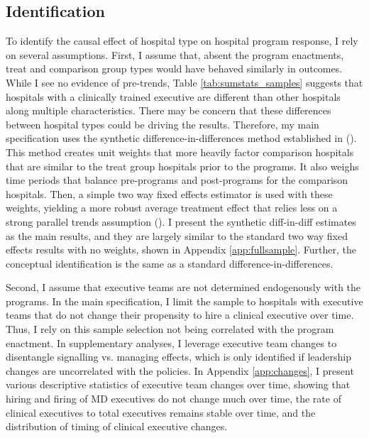 \documentclass[12pt]{article}
\begin{document}
    \subsection{Identification}\label{sec:identification}

    To identify the causal effect of hospital type on hospital program response, I rely on several assumptions. First, I assume that, absent the program enactments, treat and comparison group types would have behaved similarly in outcomes. While I see no evidence of pre-trends, Table \ref{tab:sumstats_samples} suggests that hospitals with a clinically trained executive are different than other hospitals along multiple characteristics. There may be concern that these differences between hospital types could be driving the results. Therefore, my main specification uses the synthetic difference-in-differences method established in \citeauthor{arkhangelsky2021synthetic} (\citeyear{arkhangelsky2021synthetic}). This method creates unit weights that more heavily factor comparison hospitals that are similar to the treat group hospitals prior to the programs. It also weighs time periods that balance pre-programs and post-programs for the comparison hospitals. Then, a simple two way fixed effects estimator is used with these weights, yielding a more robust average treatment effect that relies less on a strong parallel trends assumption (\cite{arkhangelsky2021synthetic}). I present the synthetic diff-in-diff estimates as the main results, and they are largely similar to the standard two way fixed effects results with no weights, shown in Appendix \ref{app:fullsample}. Further, the conceptual identification is the same as a standard difference-in-differences.

     Second, I assume that executive teams are not determined endogenously with the programs. In the main specification, I limit the sample to hospitals with executive teams that do not change their propensity to hire a clinical executive over time. Thus, I rely on this sample selection not being correlated with the program enactment. In supplementary analyses, I leverage executive team changes to disentangle signalling vs. managing effects, which is only identified if leadership changes are uncorrelated with the policies. In Appendix \ref{app:changes}, I present various descriptive statistics of executive team changes over time, showing that hiring and firing of MD executives do not change much over time, the rate of clinical executives to total executives remains stable over time, and the distribution of timing of clinical executive changes. 
\end{document}
